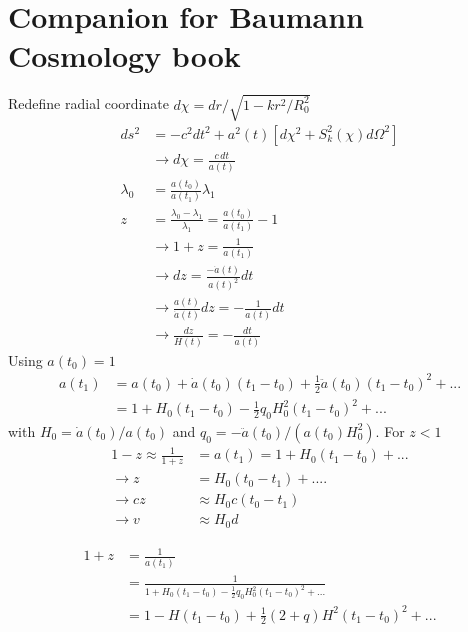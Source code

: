 \documentclass[10pt,a4paper]{book}
\theoremstyle{definition}
\begin{document}
\chapter{Companion for Baumann Cosmology book}
Redefine radial coordinate $d\chi=dr/\sqrt{1-kr^2/R_0^2}$
\begin{align}
ds^2&=-c^2dt^2+a^2(t)[d\chi^2+S_k^2(\chi)d\Omega^2]\\
&\rightarrow d\chi=\frac{c\,dt}{a(t)}\\
\lambda_0&=\frac{a(t_0)}{a(t_1)}\lambda_1\\
z&=\frac{\lambda_0-\lambda_1}{\lambda_1}=\frac{a(t_0)}{a(t_1)}-1\\
&\rightarrow1+z=\frac{1}{a(t_1)}\\
&\rightarrow dz=\frac{-\dot{a}(t)}{a(t)^2}dt\\
&\rightarrow \frac{a(t)}{\dot{a}(t)}dz=-\frac{1}{a(t)}dt\\
&\rightarrow \frac{dz}{H(t)}=-\frac{dt}{a(t)}
\end{align}
Using $a(t_0)=1$
\begin{align}
a(t_1)&=a(t_0)+\dot{a}(t_0)(t_1-t_0)+\frac{1}{2}\ddot{a}(t_0)(t_1-t_0)^2+...\\
&=1+H_0(t_1-t_0)-\frac{1}{2}q_0H_0^2(t_1-t_0)^2+...
\end{align}
with $H_0=\dot{a}(t_0)/a(t_0)$ and $q_0=-\ddot{a}(t_0)/(a(t_0)H_0^2)$. For $z<1$
\begin{align}
1-z\approx\frac{1}{1+z}&=a(t_1)=1+H_0(t_1-t_0)+...\\
\rightarrow z&=H_0(t_0-t_1)+....\\
\rightarrow cz&\approx H_0c(t_0-t_1)\\
\rightarrow v&\approx H_0d
\end{align}

\begin{align}
1+z&=\frac{1}{a(t_1)}\\
&=\frac{1}{1+H_0(t_1-t_0)-\frac{1}{2}q_0H_0^2(t_1-t_0)^2+...}\\
&=1-H(t_1-t_0)+\frac{1}{2}(2+q)H^2(t_1-t_0)^2+...
\end{align}


\newpage 
\end{document}
